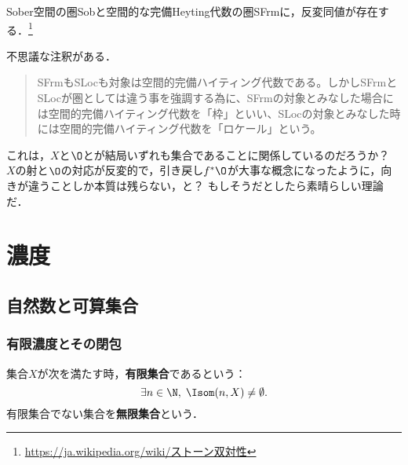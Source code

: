 \documentclass[uplatex,dvipdfmx]{jsreport}
\begin{document}
\begin{theorem}
    Sober空間の圏Sobと空間的な完備Heyting代数の圏SFrmに，反変同値が存在する．\footnote{\url{https://ja.wikipedia.org/wiki/ストーン双対性}}
\end{theorem}
\begin{remark}
    不思議な注釈がある．
    \begin{quote}
        SFrmもSLocも対象は空間的完備ハイティング代数である。しかしSFrmとSLocが圏としては違う事を強調する為に、SFrmの対象とみなした場合には空間的完備ハイティング代数を「枠」といい、SLocの対象とみなした時には空間的完備ハイティング代数を「ロケール」という。
    \end{quote}
    これは，$X$と$\O$とが結局いずれも集合であることに関係しているのだろうか？
    $X$の射と$\O$の対応が反変的で，引き戻し$f^*\O$が大事な概念になったように，向きが違うことしか本質は残らない，と？
    もしそうだとしたら素晴らしい理論だ．
\end{remark}

\chapter{濃度}

\begin{quotation}
    
\end{quotation}

\section{自然数と可算集合}

\subsection{有限濃度とその閉包}

\begin{definition}
    集合$X$が次を満たす時，\textbf{有限集合}であるという：
    \[ \exists n\in\N,\; \Isom(n,X)\ne\emptyset. \]
    有限集合でない集合を\textbf{無限集合}という．
\end{definition}
\end{document}
